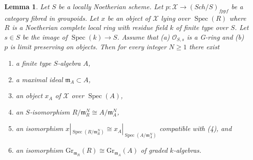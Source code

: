 \documentclass{stacks-project}
\theoremstyle{plain}
\newtheorem{lemma}[subsection]{Lemma}
\theoremstyle{definition}
\theoremstyle{remark}
\numberwithin{equation}{subsection}
\def\Spec{\mathop{\mathrm{Spec}}}
\def\Sch{\mathit{Sch}}
\begin{document}
\begin{lemma}
\label{lemma-approximate}
Let $S$ be a locally Noetherian scheme. Let
$p : \mathcal{X} \to (\Sch/S)_{fppf}$ be a category
fibred in groupoids. Let $x$ be an object of
$\mathcal{X}$ lying over $\Spec(R)$ where $R$ is a Noetherian complete
local ring with residue field $k$ of finite type over $S$. Let $s \in S$
be the image of $\Spec(k) \to S$. Assume that (a) $\mathcal{O}_{S, s}$ is
a G-ring and (b) $p$ is limit preserving on objects. Then for every
integer $N \geq 1$ there exist
\begin{enumerate}
\item a finite type $S$-algebra $A$,
\item a maximal ideal $\mathfrak m_A \subset A$,
\item an object $x_A$ of $\mathcal{X}$ over $\Spec(A)$,
\item an $S$-isomorphism $R/\mathfrak m_R^N \cong A/\mathfrak m_A^N$,
\item an isomorphism
$x|_{\Spec(R/\mathfrak m_R^N)} \cong x_A|_{\Spec(A/\mathfrak m_A^N)}$
compatible with (4), and
\item an isomorphism
$\text{Gr}_{\mathfrak m_R}(R) \cong \text{Gr}_{\mathfrak m_A}(A)$
of graded $k$-algebras.
\end{enumerate}
\end{lemma}
\end{document}
